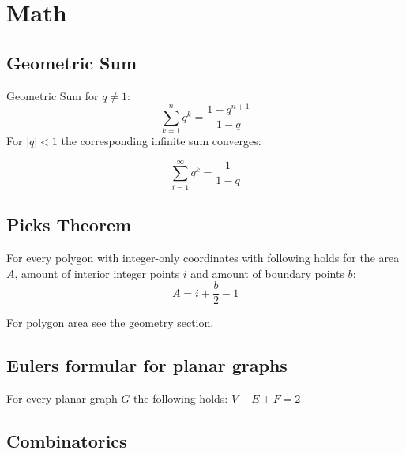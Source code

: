 \section{Math}

\subsection{Geometric Sum}
Geometric Sum for $q \neq 1$:
\[
\sum\limits_{k=1}^n q^k = \frac{1-q^{n+1}}{1-q}
\]
For $\lvert q \rvert < 1$ the corresponding infinite sum converges:

\[
\sum_{i = 1}^{\infty} q^k = \frac{1}{1 - q}
\]

\subsection{Picks Theorem}
For every polygon with integer-only coordinates with following holds
for the area $A$, amount of interior integer points $i$ and amount of
boundary points $b$:
\[
A = i + \frac{b}{2} - 1
\]

For polygon area see the geometry section.

\subsection{Eulers formular for planar graphs}
For every planar graph $G$ the following holds: $V - E + F = 2$

\subsection{Combinatorics}

